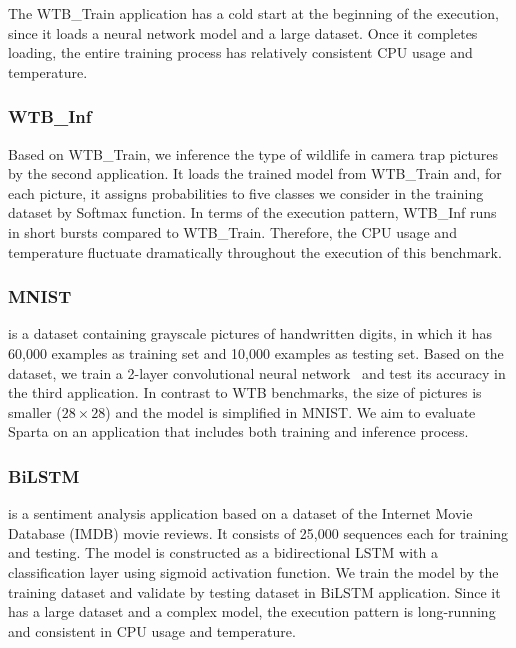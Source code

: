The WTB\_Train application has a cold start at the beginning of the execution, since it loads a neural network model and a large dataset. Once it completes loading, the entire training process has relatively consistent CPU usage and temperature. 

\subsubsection{WTB\_Inf}

Based on WTB\_Train, we inference the type of wildlife in camera trap pictures by the second application. It loads the trained model from WTB\_Train and, for each picture, it assigns probabilities to five classes we consider in the training dataset by Softmax function. In terms of the execution pattern, WTB\_Inf runs in short bursts compared to WTB\_Train. Therefore, the CPU usage and temperature fluctuate dramatically throughout the execution of this benchmark.

\subsubsection{MNIST}

 is a dataset containing grayscale pictures of handwritten digits, in which it has 60,000 examples as training set and 10,000 examples as testing set. Based on the dataset, we train a 2-layer convolutional neural network~\cite{ref:MNIST} and test its accuracy in the third application. In contrast to WTB benchmarks, the size of pictures is smaller ($28 \times 28$) and the model is simplified in MNIST. We aim to evaluate Sparta on an application that includes both training and inference process. 

\subsubsection{BiLSTM} is a sentiment analysis application based on a dataset of the Internet Movie Database (IMDB) movie reviews. It consists of 25,000 sequences each for training and testing. The model is constructed as a bidirectional LSTM with a classification layer using sigmoid activation function. We train the model by the training dataset and validate by testing dataset in BiLSTM application. Since it has a large dataset and a complex model, the execution pattern is long-running and consistent in CPU usage and temperature.


